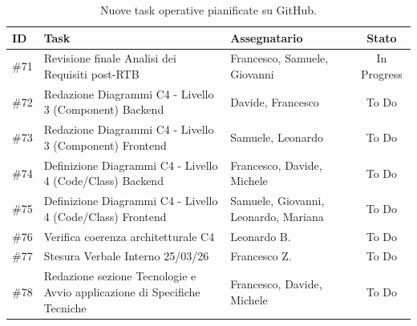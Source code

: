 \documentclass[a4paper, 11pt, oneside]{scrartcl} %
\begin{document}
\begin{table}[h!]
\centering
\small %
\begin{tabularx}{\textwidth}{@{}l X l c@{}} %
\toprule
\textbf{ID} & \textbf{Task} & \textbf{Assegnatario} & \textbf{Stato} \\
\midrule
\#71 & Revisione finale Analisi dei Requisiti post-RTB & Francesco, Samuele, Giovanni & In Progress \\
\addlinespace
\#72 & Redazione Diagrammi C4 - Livello 3 (Component) Backend & Davide, Francesco & To Do \\
\addlinespace
\#73 & Redazione Diagrammi C4 - Livello 3 (Component) Frontend & Samuele, Leonardo & To Do \\
\addlinespace
\#74 & Definizione Diagrammi C4 - Livello 4 (Code/Class) Backend & Francesco, Davide, Michele & To Do \\
\addlinespace
\#75 & Definizione Diagrammi C4 - Livello 4 (Code/Class) Frontend & Samuele, Giovanni, Leonardo, Mariana & To Do \\
\addlinespace
\#76 & Verifica coerenza architetturale C4 & Leonardo B. & To Do \\
\addlinespace
\#77 & Stesura Verbale Interno 25/03/26 & Francesco Z. & To Do \\
\addlinespace
\#78 & Redazione sezione Tecnologie e Avvio applicazione di Specifiche Tecniche & Francesco, Davide, Michele & To Do \\
\bottomrule
\end{tabularx}
\caption{Nuove task operative pianificate su GitHub.}
\end{table}

\newpage
\end{document}
